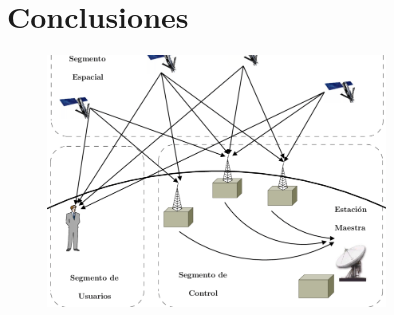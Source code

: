 \documentclass[12pt,twoside]{rif}
\begin{document}
	\section{Conclusiones}
\begin{center}
\begin{figure}[h!]
\includegraphics[width=0.8\textwidth]{img/GPS.png}
\end{figure}
\end{center}
	\nocite{*}
	
	
	
\end{document}
